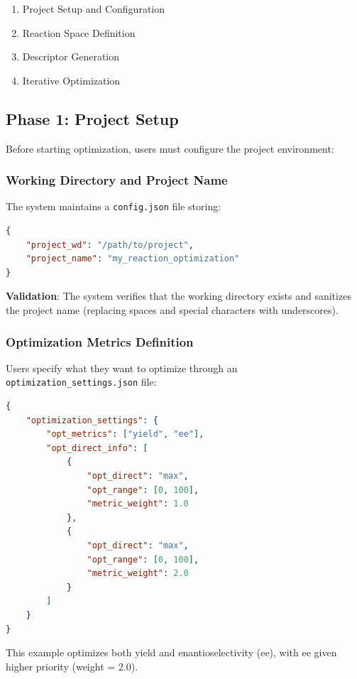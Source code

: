 \documentclass[12pt,a4paper]{article}
\begin{document}
\begin{enumerate}
    \item Project Setup and Configuration
    \item Reaction Space Definition
    \item Descriptor Generation
    \item Iterative Optimization
\end{enumerate}

\subsection{Phase 1: Project Setup}

Before starting optimization, users must configure the project environment:

\subsubsection{Working Directory and Project Name}

The system maintains a \texttt{config.json} file storing:
\begin{lstlisting}[language=json]
{
    "project_wd": "/path/to/project",
    "project_name": "my_reaction_optimization"
}
\end{lstlisting}

\textbf{Validation}: The system verifies that the working directory exists and sanitizes the project name (replacing spaces and special characters with underscores).

\subsubsection{Optimization Metrics Definition}

Users specify what they want to optimize through an \texttt{optimization\_settings.json} file:

\begin{lstlisting}[language=json]
{
    "optimization_settings": {
        "opt_metrics": ["yield", "ee"],
        "opt_direct_info": [
            {
                "opt_direct": "max",
                "opt_range": [0, 100],
                "metric_weight": 1.0
            },
            {
                "opt_direct": "max",
                "opt_range": [0, 100],
                "metric_weight": 2.0
            }
        ]
    }
}
\end{lstlisting}

This example optimizes both yield and enantioselectivity (ee), with ee given higher priority (weight = 2.0).
\end{document}
